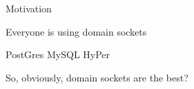 
\begin{slide}{Motivation}
  \large
  \pause

  Everyone is using domain sockets
  \pause
  \vspace{0.7cm}

  \Large
  PostGres
  \hspace{0.5cm}
  MySQL
  \hspace{0.5cm}
  HyPer

  \pause
  \large
  \vspace{1cm}
  So, obviously, domain sockets are the best?
\end{slide}

